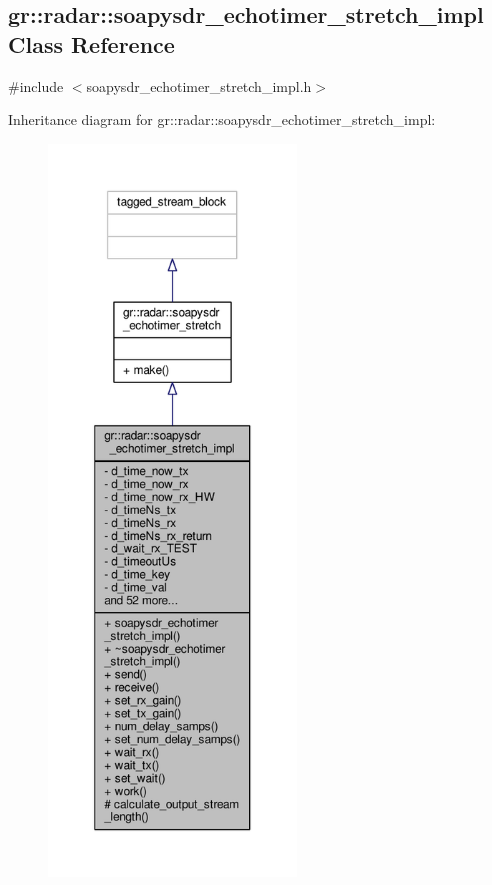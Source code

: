 \subsection{gr\+:\+:radar\+:\+:soapysdr\+\_\+echotimer\+\_\+stretch\+\_\+impl Class Reference}
\label{classgr_1_1radar_1_1soapysdr__echotimer__stretch__impl}


{\ttfamily \#include $<$soapysdr\+\_\+echotimer\+\_\+stretch\+\_\+impl.\+h$>$}



Inheritance diagram for gr\+:\+:radar\+:\+:soapysdr\+\_\+echotimer\+\_\+stretch\+\_\+impl\+:
\nopagebreak
\begin{figure}[H]
\begin{center}
\leavevmode
\includegraphics[height=550pt]{d6/d96/classgr_1_1radar_1_1soapysdr__echotimer__stretch__impl__inherit__graph}
\end{center}
\end{figure}


